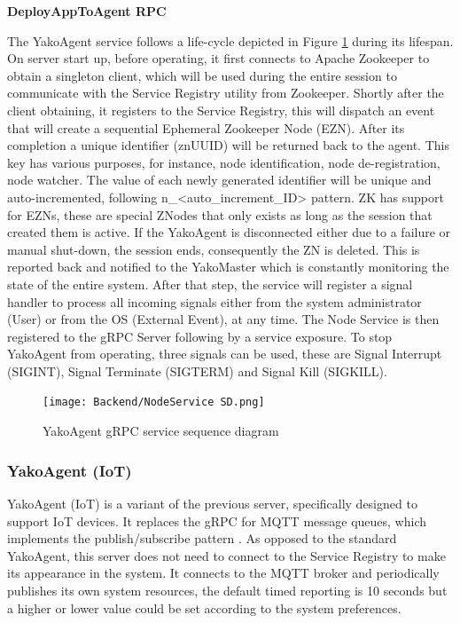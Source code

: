         \textbf{DeployAppToAgent RPC} \label{rpc_deploytoagent}
        
        The YakoAgent service follows a life-cycle depicted in Figure \ref{fig:yakoagent_sd} during its lifespan.
        On server start up, before operating, it first connects to Apache Zookeeper to obtain a singleton client, which will be used during the entire session to communicate with the Service Registry utility from Zookeeper.
        Shortly after the client obtaining, it registers to the Service Registry, this will dispatch an event that will create a sequential Ephemeral Zookeeper Node (EZN). After its completion a unique identifier (znUUID) will be returned back to the agent. This key has various purposes, for instance, node identification, node de-registration, node watcher. The value  of each newly generated identifier will be unique and auto-incremented, following n\_<auto\_increment\_ID> pattern.
        ZK has support for EZNs, these are special ZNodes that only exists as long as the session that created them is active. If the YakoAgent is disconnected either due to a failure or manual shut-down, the session ends, consequently the ZN is deleted. This is reported back and notified to the YakoMaster which is constantly monitoring the state of the entire system.
        After that step, the service will register a signal handler to process all incoming signals either from the system administrator (User) or from the OS (External Event), at any time.
        The Node Service is then registered to the gRPC Server following by a service exposure.
        To stop YakoAgent from operating, three signals can be used, these are Signal Interrupt (SIGINT), Signal Terminate (SIGTERM) and Signal Kill (SIGKILL).
        
        \begin{figure}[H]
            \centering
            \texttt{[image: Backend/NodeService SD.png]}
            \caption{YakoAgent gRPC service sequence diagram}
            \label{fig:yakoagent_sd}
        \end{figure}

    \subsubsection{YakoAgent (IoT)} \label{yakoagentiot}
        YakoAgent (IoT) is a variant of the previous server, specifically designed to support IoT devices. It replaces the gRPC for MQTT \cite{oasis_mqtt_nodate} message queues, which implements the publish/subscribe pattern \cite{camp_guide_nodate}.
        As opposed to the standard YakoAgent, this server does not need to connect to the Service Registry to make its appearance in the system. It connects to the MQTT broker and periodically publishes its own system resources, the default timed reporting is 10 seconds but a higher or lower value could be set according to the system preferences.
        
